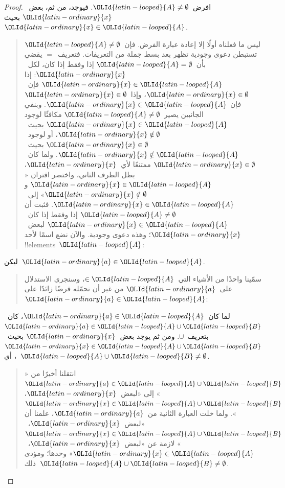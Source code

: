 \documentclass[../../../include/open-logic-section]{subfiles}
\begin{document}
\begin{proof}
  افرض~$\OLId{latin-looped}{A} \neq \emptyset$. فيوجد، من ثم، بعض~$\OLId{latin-ordinary}{x}$ بحيث~$\OLId{latin-ordinary}{x} \in \OLId{latin-looped}{A}$.
  \begin{quote}
    ليس ما فعلناه أولًا إلا إعادة عبارة الفرض. فإن~$\OLId{latin-looped}{A} \neq \emptyset$
    تستبطن دعوى وجودية تظهر بعد بسط جملة من التعريفات. فتعريف~$=$
    يقضي بأن~$\OLId{latin-looped}{A} = \emptyset$ إذا وفقط إذا كان، لكل~$\OLId{latin-ordinary}{x}$: إذا
    $\OLId{latin-ordinary}{x} \in \OLId{latin-looped}{A}$ فإن~$\OLId{latin-ordinary}{x} \in \emptyset$، وإذا~$\OLId{latin-ordinary}{x} \in \emptyset$ فإن
    $\OLId{latin-ordinary}{x} \in \OLId{latin-looped}{A}$. وبنفي الجانبين يصير~$\OLId{latin-looped}{A} \neq \emptyset$ مكافئًا لوجود
    $\OLId{latin-ordinary}{x} \in \OLId{latin-looped}{A}$ بحيث~$\OLId{latin-ordinary}{x} \notin \emptyset$، أو لوجود~$\OLId{latin-ordinary}{x} \in \emptyset$
    بحيث~$\OLId{latin-ordinary}{x} \notin \OLId{latin-looped}{A}$. ولما كان~$\OLId{latin-ordinary}{x} \in \emptyset$ ممتنعًا لأي~$\OLId{latin-ordinary}{x}$،
    بطل الطرف الثاني، واختصر اقتران «$\OLId{latin-ordinary}{x} \in \OLId{latin-looped}{A}$ و
    $\OLId{latin-ordinary}{x} \notin \emptyset$» إلى~$\OLId{latin-ordinary}{x} \in \OLId{latin-looped}{A}$. فثبت أن
    $\OLId{latin-looped}{A} \neq \emptyset$ إذا وفقط إذا كان~$\OLId{latin-ordinary}{x} \in \OLId{latin-looped}{A}$ لبعض~$\OLId{latin-ordinary}{x}$؛ وهذه
    دعوى وجودية. والآن نضع اسمًا لأحد !!{element}s~$\OLId{latin-looped}{A}$:
  \end{quote}
  ليكن~$\OLId{latin-ordinary}{a} \in \OLId{latin-looped}{A}$.
  \begin{quote}
    سمّينا واحدًا من الأشياء التي~$\in \OLId{latin-looped}{A}$، وسنجري الاستدلال على~$\OLId{latin-ordinary}{a}$
    من غير أن نحمّله فرضًا زائدًا على~$\OLId{latin-ordinary}{a} \in \OLId{latin-looped}{A}$:
  \end{quote}
  لما كان~$\OLId{latin-ordinary}{a} \in \OLId{latin-looped}{A}$، كان~$\OLId{latin-ordinary}{a} \in \OLId{latin-looped}{A} \cup \OLId{latin-looped}{B}$ بتعريف~$\cup$. ومن ثم
  يوجد بعض~$\OLId{latin-ordinary}{x}$ بحيث~$\OLId{latin-ordinary}{x} \in \OLId{latin-looped}{A} \cup \OLId{latin-looped}{B}$، أي~$\OLId{latin-looped}{A} \cup \OLId{latin-looped}{B} \neq \emptyset$.
  \begin{quote}
    انتقلنا أخيرًا من «$\OLId{latin-ordinary}{a} \in \OLId{latin-looped}{A} \cup \OLId{latin-looped}{B}$» إلى «لبعض~$\OLId{latin-ordinary}{x}$،
    $\OLId{latin-ordinary}{x} \in \OLId{latin-looped}{A} \cup \OLId{latin-looped}{B}$». ولما خلت العبارة الثانية من~$\OLId{latin-ordinary}{a}$، علمنا أن
    «لبعض~$\OLId{latin-ordinary}{x}$،~$\OLId{latin-ordinary}{x} \in \OLId{latin-looped}{A} \cup \OLId{latin-looped}{B}$» لازمة عن «لبعض~$\OLId{latin-ordinary}{x}$،~$\OLId{latin-ordinary}{x} \in \OLId{latin-looped}{A}$»
    وحدها؛ ومؤدى ذلك~$\OLId{latin-looped}{A} \cup \OLId{latin-looped}{B} \neq \emptyset$.
  \end{quote}
\end{proof}
\end{document}
